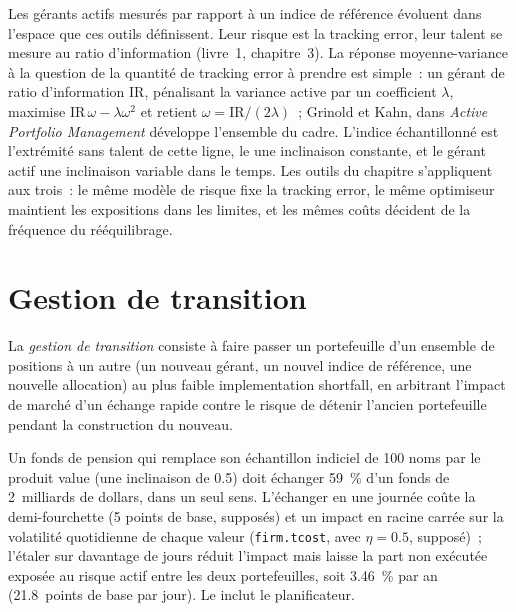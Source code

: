 Les gérants actifs mesurés par rapport à un indice de référence évoluent dans l'espace que ces outils définissent. Leur risque est la tracking error, leur talent se mesure au ratio d'information
(livre~1, chapitre~3). La réponse moyenne-variance à la question de la quantité de tracking error à prendre est simple~: un gérant de ratio d'information IR, pénalisant la
variance active par un coefficient $\lambda$, maximise $\text{IR}\,\omega - \lambda\omega^2$ et retient $\omega = \text{IR}/(2\lambda)$~; Grinold et Kahn, dans
\emph{Active Portfolio Management} développe l'ensemble du cadre. L'indice échantillonné est l'extrémité sans talent de cette ligne, le 
une inclinaison constante, et le gérant actif une inclinaison variable dans le temps. Les outils du chapitre s'appliquent aux trois~: le même modèle de risque fixe la tracking error, le même
optimiseur maintient les expositions dans les limites, et les mêmes coûts décident de la fréquence du rééquilibrage.

\section{Gestion de transition}

\begin{definition}\label{def:s1:the-asset-managers-strategies:transition}
La \emph{gestion de transition} consiste à faire passer un portefeuille d'un ensemble de positions à un autre (un nouveau
gérant, un nouvel indice de référence, une nouvelle allocation) au plus faible implementation shortfall, en arbitrant l'impact de marché d'un échange rapide contre le risque de détenir l'ancien
portefeuille pendant la construction du nouveau.
\end{definition}

Un fonds de pension qui remplace son échantillon indiciel de 100 noms par le produit value (une inclinaison de 0.5) doit échanger 59~\% d'un fonds de 2~milliards de dollars, dans un seul sens. L'échanger
en une journée coûte la demi-fourchette (5 points de base, supposés) et un impact en racine carrée sur la volatilité quotidienne de chaque valeur (\texttt{firm.tcost}, avec $\eta = 0.5$,
supposé)~; l'étaler sur davantage de jours réduit l'impact mais laisse la part non exécutée exposée au risque actif entre les deux portefeuilles, soit 3.46~\% par
an (21.8~points de base par jour). Le  inclut le planificateur.


